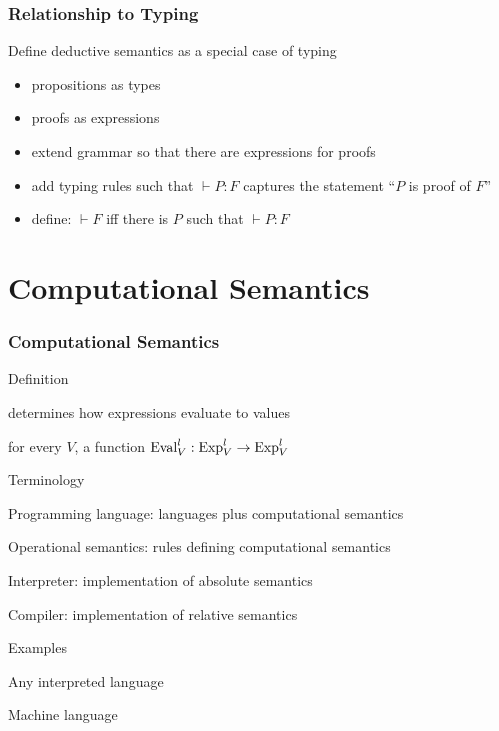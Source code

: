 \begin{frame}\frametitle{Relationship to Typing}
Define deductive semantics as a special case of typing
\begin{itemize}
\item propositions as types
\item proofs as expressions
\item extend grammar so that there are expressions for proofs
\item add typing rules such that $\vdash P:F$ captures the statement ``$P$ is proof of $F$''
\item define: $\vdash F$ iff there is $P$ such that $\vdash P:F$
\end{itemize}
\end{frame}

\section{Computational Semantics}

\begin{frame}\frametitle{Computational Semantics}
\begin{blockitems}{Definition}
\item determines how expressions evaluate to values
\item for every $V$, a function $\mathrm{Eval}^l_V:\mathrm{Exp}^l_V\to\mathrm{Exp}^l_V$
\end{blockitems}

\begin{blockitems}{Terminology}
\item Programming language: languages plus computational semantics
\item Operational semantics: rules defining computational semantics
\item Interpreter: implementation of absolute semantics
\item Compiler: implementation of relative semantics
\end{blockitems}

\begin{blockitems}{Examples}
\item Any interpreted language 
\item Machine language 
\end{blockitems}
\end{frame}

